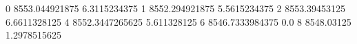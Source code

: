 0 8553.044921875 6.3115234375
1 8552.294921875 5.5615234375
2 8553.39453125 6.6611328125
4 8552.3447265625 5.611328125
6 8546.7333984375 0.0
8 8548.03125 1.2978515625
